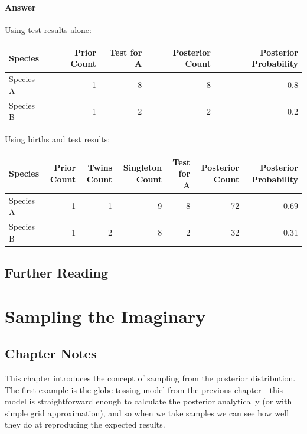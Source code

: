 \documentclass[
]{book}
\begin{document}
\hypertarget{answer-14}{%
\subsubsection*{Answer}\label{answer-14}}

Using test results alone:

\begin{tabular}{l|r|r|r|r}
\hline
Species & Prior Count & Test for A & Posterior Count & Posterior Probability\\
\hline
Species A & 1 & 8 & 8 & 0.8\\
\hline
Species B & 1 & 2 & 2 & 0.2\\
\hline
\end{tabular}

Using births and test results:

\begin{tabular}{l|r|r|r|r|r|r}
\hline
Species & Prior Count & Twins Count & Singleton Count & Test for A & Posterior Count & Posterior Probability\\
\hline
Species A & 1 & 1 & 9 & 8 & 72 & 0.69\\
\hline
Species B & 1 & 2 & 8 & 2 & 32 & 0.31\\
\hline
\end{tabular}

\hypertarget{further-reading-1}{%
\section*{Further Reading}\label{further-reading-1}}

\hypertarget{sampling_imaginary}{%
\chapter{Sampling the Imaginary}\label{sampling_imaginary}}

\hypertarget{chapter-notes-2}{%
\section{Chapter Notes}\label{chapter-notes-2}}

This chapter introduces the concept of sampling from the posterior distribution. The first example is the globe tossing model from the previous chapter - this model is straightforward enough to calculate the posterior analytically (or with simple grid approximation), and so when we take samples we can see how well they do at reproducing the expected results.
\end{document}

